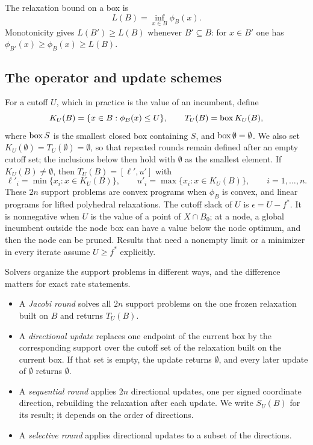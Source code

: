 The relaxation bound on a box is
\[
  L(B)=\inf_{x\in B}\phi_B(x).
\]
Monotonicity gives $L(B')\ge L(B)$ whenever $B'\subseteq B$: for $x\in B'$
one has $\phi_{B'}(x)\ge\phi_B(x)\ge L(B)$.

\subsection{The operator and update schemes}

For a cutoff $U$, which in practice is the value of an incumbent, define
\begin{equation}\label{eq:operator}
  K_U(B)=\{x\in B:\phi_B(x)\le U\},\qquad
  T_U(B)=\operatorname{box} K_U(B),
\end{equation}
where $\operatorname{box} S$ is the smallest closed box containing $S$, and
$\operatorname{box}\emptyset=\emptyset$. We also set $K_U(\emptyset)=T_U(\emptyset)=\emptyset$,
so that repeated rounds remain defined after an empty cutoff set; the
inclusions below then hold with $\emptyset$ as the smallest element. If
$K_U(B)\ne\emptyset$, then
$T_U(B)=[\ell',u']$ with
\[
  \ell'_i=\min\{x_i:x\in K_U(B)\},\qquad
  u'_i=\max\{x_i:x\in K_U(B)\},\qquad i=1,\dots,n.
\]
These $2n$ support problems are convex programs when $\phi_B$ is convex,
and linear programs for lifted polyhedral relaxations. The cutoff slack of
$U$ is $\epsilon=U-f^*$. It is nonnegative when $U$ is the value of a point
of $X\cap B_0$; at a node, a global incumbent outside the node box can have
a value below the node optimum, and then the node can be pruned. Results
that need a nonempty limit or a minimizer in every iterate assume
$U\ge f^*$ explicitly.

Solvers organize the support problems in different ways, and the
difference matters for exact rate statements.
\begin{itemize}
\item A \emph{Jacobi round} solves all $2n$ support problems on the one
  frozen relaxation built on $B$ and returns $T_U(B)$.
\item A \emph{directional update} replaces one endpoint of the current box
  by the corresponding support over the cutoff set of the relaxation built
  on the current box. If that set is empty, the update returns $\emptyset$,
  and every later update of $\emptyset$ returns $\emptyset$.
\item A \emph{sequential round} applies $2n$ directional updates, one per
  signed coordinate direction, rebuilding the relaxation after each update.
  We write $S_U(B)$ for its result; it depends on the order of directions.
\item A \emph{selective round} applies directional updates to a subset of
  the directions.
\end{itemize}


